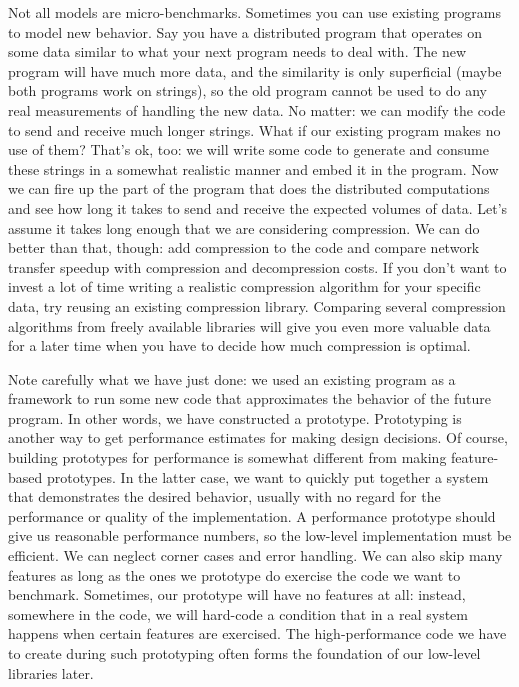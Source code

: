 Not all models are micro-benchmarks. Sometimes you can use existing programs to model new behavior. Say you have a distributed program that operates on some data similar to what your next program needs to deal with. The new program will have much more data, and the similarity is only superficial (maybe both programs work on strings), so the old program cannot be used to do any real measurements of handling the new data. No matter: we can modify the code to send and receive much longer strings. What if our existing program makes no use of them? That's ok, too: we will write some code to generate and consume these strings in a somewhat realistic manner and embed it in the program. Now we can fire up the part of the program that does the distributed computations and see how long it takes to send and receive the expected volumes of data. Let's assume it takes long enough that we are considering compression. We can do better than that, though: add compression to the code and compare network transfer speedup with compression and decompression costs. If you don't want to invest a lot of time writing a realistic compression algorithm for your specific data, try reusing an existing compression library. Comparing several compression algorithms from freely available libraries will give you even more valuable data for a later time when you have to decide how much compression is optimal. 

Note carefully what we have just done: we used an existing program as a framework to run some new code that approximates the behavior of the future program. In other words, we have constructed a prototype. Prototyping is another way to get performance estimates for making design decisions. Of course, building prototypes for performance is somewhat different from making feature-based prototypes. In the latter case, we want to quickly put together a system that demonstrates the desired behavior, usually with no regard for the performance or quality of the implementation. A performance prototype should give us reasonable performance numbers, so the low-level implementation must be efficient. We can neglect corner cases and error handling. We can also skip many features as long as the ones we prototype do exercise the code we want to benchmark. Sometimes, our prototype will have no features at all: instead, somewhere in the code, we will hard-code a condition that in a real system happens when certain features are exercised. The high-performance code we have to create during such prototyping often forms the foundation of our low-level libraries later.

